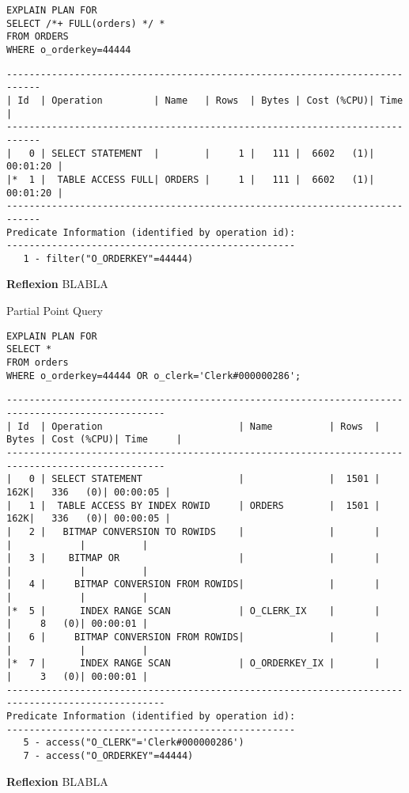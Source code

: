 \documentclass[10pt]{article}
\begin{document}
\begin{lstlisting}[style=sql]
EXPLAIN PLAN FOR
SELECT /*+ FULL(orders) */ *
FROM ORDERS
WHERE o_orderkey=44444
\end{lstlisting}
\begin{lstlisting}[style=queryexecutionplan]
----------------------------------------------------------------------------
| Id  | Operation         | Name   | Rows  | Bytes | Cost (%CPU)| Time     |
----------------------------------------------------------------------------
|   0 | SELECT STATEMENT  |        |     1 |   111 |  6602   (1)| 00:01:20 |
|*  1 |  TABLE ACCESS FULL| ORDERS |     1 |   111 |  6602   (1)| 00:01:20 |
----------------------------------------------------------------------------
Predicate Information (identified by operation id):
---------------------------------------------------
   1 - filter("O_ORDERKEY"=44444)
\end{lstlisting}
\textbf{Reflexion} \newline
BLABLA

Partial Point Query
\begin{lstlisting}[style=sql]
EXPLAIN PLAN FOR
SELECT *
FROM orders
WHERE o_orderkey=44444 OR o_clerk='Clerk#000000286';
\end{lstlisting}
\begin{lstlisting}[style=queryexecutionplan]
--------------------------------------------------------------------------------------------------
| Id  | Operation                        | Name          | Rows  | Bytes | Cost (%CPU)| Time     |
--------------------------------------------------------------------------------------------------
|   0 | SELECT STATEMENT                 |               |  1501 |   162K|   336   (0)| 00:00:05 |
|   1 |  TABLE ACCESS BY INDEX ROWID     | ORDERS        |  1501 |   162K|   336   (0)| 00:00:05 |
|   2 |   BITMAP CONVERSION TO ROWIDS    |               |       |       |            |          |
|   3 |    BITMAP OR                     |               |       |       |            |          |
|   4 |     BITMAP CONVERSION FROM ROWIDS|               |       |       |            |          |
|*  5 |      INDEX RANGE SCAN            | O_CLERK_IX    |       |       |     8   (0)| 00:00:01 |
|   6 |     BITMAP CONVERSION FROM ROWIDS|               |       |       |            |          |
|*  7 |      INDEX RANGE SCAN            | O_ORDERKEY_IX |       |       |     3   (0)| 00:00:01 |
--------------------------------------------------------------------------------------------------
Predicate Information (identified by operation id):
---------------------------------------------------
   5 - access("O_CLERK"='Clerk#000000286')
   7 - access("O_ORDERKEY"=44444)
\end{lstlisting}
\textbf{Reflexion} \newline
BLABLA
\end{document}
